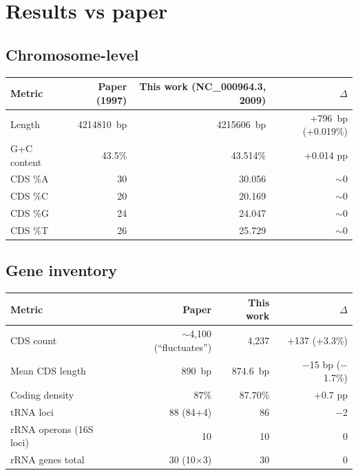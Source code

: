 \documentclass[11pt,letterpaper]{article}
\begin{document}
\section{Results vs paper}

\subsection{Chromosome-level}
\begin{center}
\begin{tabular}{@{}lrrr@{}}
\toprule
Metric & Paper (1997) & This work (NC\_000964.3, 2009) & $\Delta$ \\
\midrule
Length          & \SI{4214810}{bp} & \SI{4215606}{bp} & +\SI{796}{bp} (+0.019\%) \\
G+C content     & 43.5\%           & 43.514\%          & +0.014 pp \\
CDS \%A         & 30               & 30.056            & $\sim$0 \\
CDS \%C         & 20               & 20.169            & $\sim$0 \\
CDS \%G         & 24               & 24.047            & $\sim$0 \\
CDS \%T         & 26               & 25.729            & $\sim$0 \\
\bottomrule
\end{tabular}
\end{center}

\subsection{Gene inventory}
\begin{center}
\begin{tabular}{@{}lrrr@{}}
\toprule
Metric & Paper & This work & $\Delta$ \\
\midrule
CDS count               & $\sim$4,100 (``fluctuates'') & 4,237 & +137 (+3.3\%) \\
Mean CDS length         & \SI{890}{bp}                 & \SI{874.6}{bp} & $-$15 bp ($-$1.7\%) \\
Coding density          & 87\%                          & 87.70\%        & +0.7 pp \\
tRNA loci               & 88 (84+4)                     & 86             & $-$2 \\
rRNA operons (16S loci) & 10                            & 10             & 0 \\
rRNA genes total        & 30 (10$\times$3)              & 30             & 0 \\
\bottomrule
\end{tabular}
\end{center}
\end{document}
